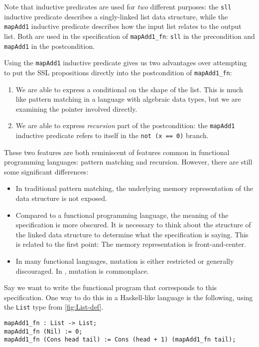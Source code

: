 \noindent
Note that inductive predicates are used for \textit{two} different purposes: the \verb|sll| inductive
predicate describes a singly-linked list data structure, while the \verb|mapAdd1| inductive predicate 
describes how the input list relates to the output list. Both are used in the specification of
\verb|mapAdd1_fn|: \verb|sll| in the precondition and \verb|mapAdd1| in the postcondition.

Using the \verb|mapAdd1| inductive predicate gives us two advantages over attempting to
put the SSL propositions directly into the postcondition of \verb|mapAdd1_fn|:
%
\begin{enumerate}
  \item We are able to express a conditional on the shape of the list. This is much like pattern
    matching in a language with algebraic data types, but we are examining the pointer involved directly.
  \item We are able to express \textit{recursion} part of the postcondition: the \verb|mapAdd1| inductive
    predicate refers to itself in the \verb|not (x == 0)| branch.
\end{enumerate}
%
These two features are both reminiscent of features common in
functional programming languages: pattern matching and recursion.
However, there are still some significant differences:

\begin{itemize}
  \item In traditional pattern matching, the underlying memory representation of the data structure is not exposed.
  \item Compared to a functional programming language, the meaning of the specification is more obscured. It is
    necessary to think about the structure of the linked data structure to determine what the specification is saying. This
    is related to the first point: The memory representation is front-and-center.
  \item In many functional languages, mutation is either restricted or generally discouraged. In \SuSLik, mutation is commonplace.
\end{itemize}

Say we want to write the functional program that corresponds to this specification. One way to do this in a Haskell-like language
is the following, using the \verb|List| type from \autoref{fig:List-def}.

\begin{lstlisting}
mapAdd1_fn : List -> List;
mapAdd1_fn (Nil) := 0;
mapAdd1_fn (Cons head tail) := Cons (head + 1) (mapAdd1_fn tail);
\end{lstlisting}

